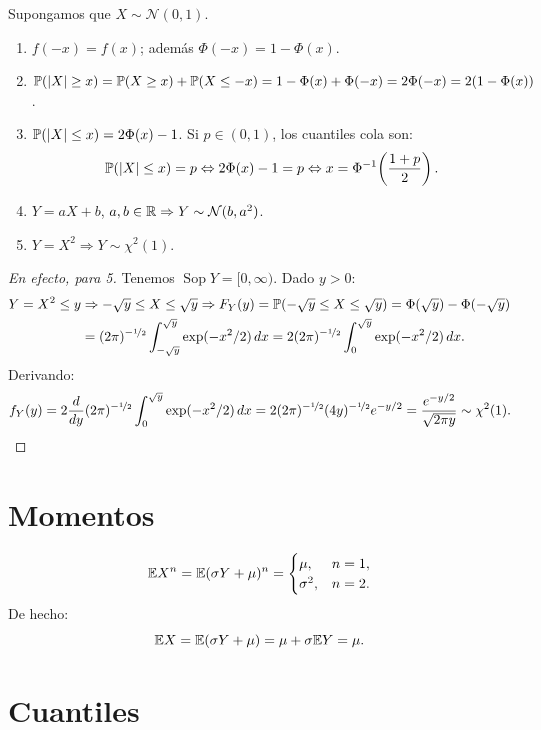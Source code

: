 \begin{proposicion}[59]
Supongamos que $X \sim \mathcal{N}(0,1)$.
\begin{enumerate}
  \item $f(-x) = f(x)$; además $\Phi(-x) = 1 - \Phi(x)$.
  \item $\mathbb{P}(|X| \ge x) = \mathbb{P}(X \ge x) + \mathbb{P}(X \le -x) = 1 - \Phi(x) + \Phi(-x) = 2\Phi(-x) = 2(1 - \Phi(x))$.
  \item $\mathbb{P}(|X| \le x) = 2\Phi(x) - 1$. Si $p \in (0,1)$, los cuantiles cola son:
        \[
          \mathbb{P}(|X| \le x) = p \Leftrightarrow 2\Phi(x) - 1 = p \Leftrightarrow x = \Phi^{-1}\!\left(\frac{1+p}{2}\right).
        \]
  \item $Y = aX + b$, $a, b \in \mathbb{R} \Rightarrow Y \sim \mathcal{N}(b, a^2)$.
  \item $Y = X^2 \Rightarrow Y \sim \chi^2(1)$.
\end{enumerate}
\end{proposicion}

\begin{proof}[En efecto, para 5]
Tenemos $\operatorname{Sop} Y = [0, \infty)$. Dado $y > 0$:
\begin{align*}
  Y = X^2 \le y &\Rightarrow -\sqrt{y} \le X \le \sqrt{y} \Rightarrow F_Y(y) = \mathbb{P}(-\sqrt{y} \le X \le \sqrt{y}) = \Phi(\sqrt{y}) - \Phi(-\sqrt{y}) \\
                &= (2\pi)^{-\nicefrac{1}{2}} \int_{-\sqrt{y}}^{\sqrt{y}} \exp(-x^2/2)\,dx = 2(2\pi)^{-\nicefrac{1}{2}} \int_{0}^{\sqrt{y}} \exp(-x^2/2)\,dx.
\end{align*}
Derivando:
\[
  f_Y(y) = 2\frac{d}{dy}(2\pi)^{-\nicefrac{1}{2}} \int_{0}^{\sqrt{y}} \exp(-x^2/2)\,dx = 2(2\pi)^{-\nicefrac{1}{2}}(4y)^{-\nicefrac{1}{2}} e^{-y/2} = \frac{e^{-y/2}}{\sqrt{2\pi y}} \sim \chi^2(1).
\]
\end{proof}

\section{Momentos}
\[
  \mathbb{E} X^n = \mathbb{E}(\sigma Y + \mu)^n =
  \begin{cases}
    \mu, & n = 1, \\
    \sigma^2, & n = 2.
  \end{cases}
\]
De hecho:
\[
  \mathbb{E} X = \mathbb{E}(\sigma Y + \mu) = \mu + \sigma \mathbb{E} Y = \mu.
\]

\section{Cuantiles}

